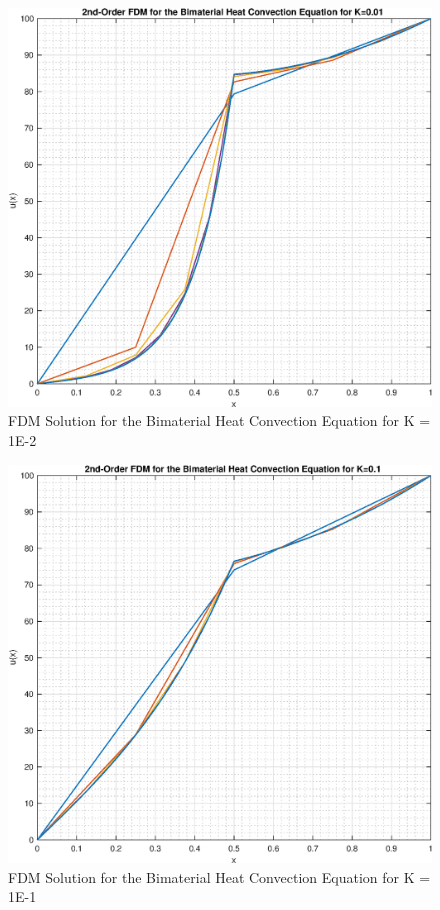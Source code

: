 \documentclass[10pt]{article}
\begin{document}
\begin{figure}[H]
	\begin{center}
		\includegraphics[width=0.6\linewidth]{solution_K_001}
		\caption{FDM Solution for the Bimaterial Heat Convection Equation for K = 1E-2}
	\end{center}
\end{figure}
\vfill
\begin{figure}[H]
	\begin{center}
		\includegraphics[width=0.6\linewidth]{solution_K_01}
		\caption{FDM Solution for the Bimaterial Heat Convection Equation for K = 1E-1}
	\end{center}
\end{figure}
\end{document}
